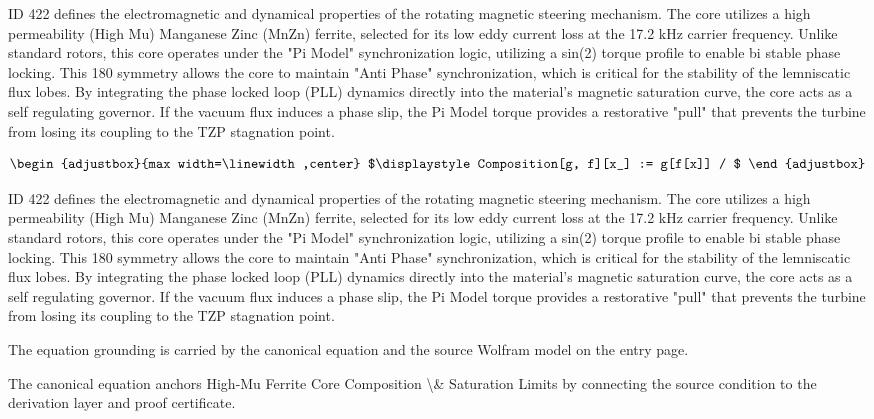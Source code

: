 ID 422 defines the electromagnetic and dynamical properties of the rotating magnetic steering mechanism. The core utilizes a high permeability (High Mu) Manganese Zinc (MnZn) ferrite, selected for its low eddy current loss at the 17.2 kHz carrier frequency. Unlike standard rotors, this core operates under the "Pi Model" synchronization logic, utilizing a sin(2) torque profile to enable bi stable phase locking. This 180 symmetry allows the core to maintain "Anti Phase" synchronization, which is critical for the stability of the lemniscatic flux lobes. By integrating the phase locked loop (PLL) dynamics directly into the material's magnetic saturation curve, the core acts as a self regulating governor. If the vacuum flux induces a phase slip, the Pi Model torque provides a restorative "pull" that prevents the turbine from losing its coupling to the TZP stagnation point.

\[
\begin{adjustbox}{max width=\linewidth,center}
$\displaystyle
Composition[g, f][x_] := g[f[x]] /
$
\end{adjustbox}
\]

ID 422 defines the electromagnetic and dynamical properties of the rotating magnetic steering mechanism. The core utilizes a high permeability (High Mu) Manganese Zinc (MnZn) ferrite, selected for its low eddy current loss at the 17.2 kHz carrier frequency. Unlike standard rotors, this core operates under the "Pi Model" synchronization logic, utilizing a sin(2) torque profile to enable bi stable phase locking. This 180 symmetry allows the core to maintain "Anti Phase" synchronization, which is critical for the stability of the lemniscatic flux lobes. By integrating the phase locked loop (PLL) dynamics directly into the material's magnetic saturation curve, the core acts as a self regulating governor. If the vacuum flux induces a phase slip, the Pi Model torque provides a restorative "pull" that prevents the turbine from losing its coupling to the TZP stagnation point.

The equation grounding is carried by the canonical equation and the source Wolfram model on the entry page.

The canonical equation anchors High-Mu Ferrite Core Composition \textbackslash{}\& Saturation Limits by connecting the source condition to the derivation layer and proof certificate.

